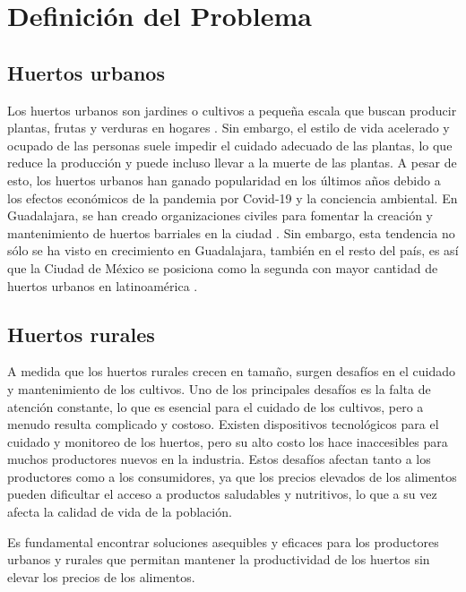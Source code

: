 \section{Definición del Problema}

\subsection{Huertos urbanos}

Los huertos urbanos son jardines o cultivos a pequeña escala que buscan producir plantas, frutas y verduras en hogares \citep{gobmx_huertos_urbanos}. Sin embargo, el estilo de vida acelerado y ocupado de las personas suele impedir el cuidado adecuado de las plantas, lo que reduce la producción y puede incluso llevar a la muerte de las plantas. A pesar de esto, los huertos urbanos han ganado popularidad en los últimos años debido a los efectos económicos de la pandemia por Covid-19 y la conciencia ambiental. En Guadalajara, se han creado organizaciones civiles para fomentar la creación y mantenimiento de huertos barriales en la ciudad \citep{huertos_urbanos_gdl}. Sin embargo, esta tendencia no sólo se ha visto en crecimiento en Guadalajara, también en el resto del país, es así que la Ciudad de México se posiciona como la segunda con mayor cantidad de huertos urbanos en latinoamérica \citep{huertos_urbanos_cdmx}.

\subsection{Huertos rurales}

A medida que los huertos rurales crecen en tamaño, surgen desafíos en el cuidado y mantenimiento de los cultivos. Uno de los principales desafíos es la falta de atención constante, lo que es esencial para el cuidado de los cultivos, pero a menudo resulta complicado y costoso. Existen dispositivos tecnológicos para el cuidado y monitoreo de los huertos, pero su alto costo los hace inaccesibles para muchos productores nuevos en la industria. Estos desafíos afectan tanto a los productores como a los consumidores, ya que los precios elevados de los alimentos pueden dificultar el acceso a productos saludables y nutritivos, lo que a su vez afecta la calidad de vida de la población.

Es fundamental encontrar soluciones asequibles y eficaces para los productores urbanos y rurales que permitan mantener la productividad de los huertos sin elevar los precios de los alimentos.